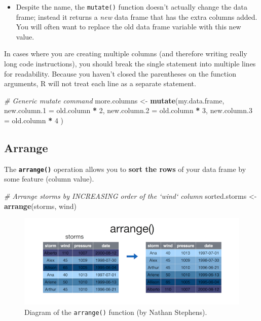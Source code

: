 \documentclass[]{book}
\newenvironment{Shaded}{\begin{snugshade}}{\end{snugshade}}
\newcommand{\KeywordTok}[1]{\textcolor[rgb]{0.13,0.29,0.53}{\textbf{#1}}}
\newcommand{\DataTypeTok}[1]{\textcolor[rgb]{0.13,0.29,0.53}{#1}}
\newcommand{\DecValTok}[1]{\textcolor[rgb]{0.00,0.00,0.81}{#1}}
\newcommand{\StringTok}[1]{\textcolor[rgb]{0.31,0.60,0.02}{#1}}
\newcommand{\CommentTok}[1]{\textcolor[rgb]{0.56,0.35,0.01}{\textit{#1}}}
\newcommand{\OperatorTok}[1]{\textcolor[rgb]{0.81,0.36,0.00}{\textbf{#1}}}
\newcommand{\NormalTok}[1]{#1}
\providecommand{\tightlist}{%
  \setlength{\itemsep}{0pt}\setlength{\parskip}{0pt}}
\theoremstyle{definition}
\theoremstyle{definition}
\theoremstyle{remark}
\begin{document}
\begin{itemize}
\tightlist
\item
  Despite the name, the \texttt{mutate()} function doesn't actually
  change the data frame; instead it returns a \emph{new} data frame that
  has the extra columns added. You will often want to replace the old
  data frame variable with this new value.
\end{itemize}

In cases where you are creating multiple columns (and therefore writing
really long code instructions), you should break the single statement
into multiple lines for readability. Because you haven't closed the
parentheses on the function arguments, R will not treat each line as a
separate statement.

\begin{Shaded}
\begin{Highlighting}[]
\CommentTok{# Generic mutate command}
\NormalTok{more.columns <-}\StringTok{ }\KeywordTok{mutate}\NormalTok{(my.data.frame,}
                       \DataTypeTok{new.column.1 =}\NormalTok{ old.column }\OperatorTok{*}\StringTok{ }\DecValTok{2}\NormalTok{,}
                       \DataTypeTok{new.column.2 =}\NormalTok{ old.column }\OperatorTok{*}\StringTok{ }\DecValTok{3}\NormalTok{,}
                       \DataTypeTok{new.column.3 =}\NormalTok{ old.column }\OperatorTok{*}\StringTok{ }\DecValTok{4}
\NormalTok{                      )}
\end{Highlighting}
\end{Shaded}

\subsection{Arrange}\label{arrange}

The \textbf{\texttt{arrange()}} operation allows you to \textbf{sort the
rows} of your data frame by some feature (column value).

\begin{Shaded}
\begin{Highlighting}[]
\CommentTok{# Arrange storms by INCREASING order of the `wind` column}
\NormalTok{sorted.storms <-}\StringTok{ }\KeywordTok{arrange}\NormalTok{(storms, wind)}
\end{Highlighting}
\end{Shaded}

\begin{figure}
\centering
\includegraphics{img/dplyr/arrange.png}
\caption{Diagram of the \texttt{arrange()} function (by Nathan
Stephens).}
\end{figure}
\end{document}
